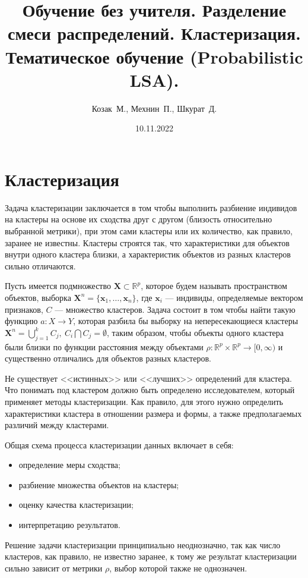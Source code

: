 \documentclass[10pt]{article}
\title{Обучение без учителя. Разделение смеси распределений. Кластеризация. Тематическое обучение (Probabilistic LSA). }
\author{Козак~М., Мехнин~П., Шкурат~Д.}
\date{10.11.2022} %
\begin{document}
\maketitle
	
	
\section{Кластеризация}
	
	 		
Задача кластеризации заключается в том чтобы выполнить разбиение индивидов на кластеры на основе их сходства друг с другом (близость относительно выбранной метрики), при этом сами кластеры или их количество, как правило, заранее не известны. Кластеры строятся так, что характеристики для объектов внутри одного кластера близки, а характеристик объектов из разных кластеров сильно отличаются.

Пусть имеется подмножество $\pmb X \subset \mathbb{R}^{p}$, которое будем называть
пространством объектов, выборка $\pmb X^{n} = \{\pmb x_1, \dots, \pmb x_{n}\}$, где $\pmb x_{i} $ --- индивиды, определяемые вектором признаков, $C$ --- множество кластеров. Задача состоит в том чтобы найти такую функцию $a: X \rightarrow Y$, которая разбила бы выборку на непересекающиеся кластеры $\pmb X^{n}= \bigcup_{j = 1}^{k} C_{j}, \  C_{i} \bigcap C_{j} = \emptyset$, таким образом, чтобы объекты одного кластера были близки по функции расстояния между объектами $\rho :  \mathbb{R}^{p} \times  \mathbb{R}^{p} \rightarrow [0,\infty)$ и существенно отличались для объектов разных кластеров.


Не существует <<истинных>> или <<лучших>> определений для кластера. Что понимать под кластером должно быть определено исследователем, который применяет методы кластеризации. Как правило, для этого нужно определить характеристики кластера в отношении размера и формы, а также предполагаемых различий между кластерами.

Общая схема процесса кластеризации данных включает в себя: 
\begin{itemize}
	\item определение меры сходства;
	\item разбиение множества объектов на кластеры;
	\item оценку качества кластеризации;
	\item интерпретацию результатов.
\end{itemize}
	
Решение задачи кластеризации принципиально неоднозначно, так как число кластеров, как правило, не известно заранее, к тому же результат кластеризации сильно зависит от метрики $\rho$, выбор которой также не однозначен.
\end{document}

